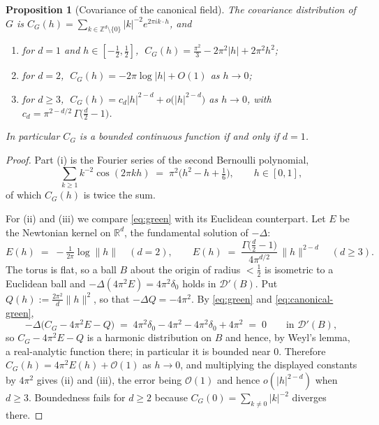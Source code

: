 \documentclass[10pt,a4paper]{amsart}
\newtheorem{proposition}{Proposition}
\newcommand{\RR}{\mathbb{R}}
\newcommand{\ZZ}{\mathbb{Z}}
\newcommand{\calD}{\mathcal{D}}
\newcommand{\calO}{\mathcal{O}}
\begin{document}
\begin{proposition}[Covariance of the canonical field]\label{prop:canonical-cov}
The covariance distribution of $G$ is
$C_G(h) = \sum_{k \in \ZZ^d\setminus\{0\}} |k|^{-2} e^{2\pi i k\cdot h}$, and
\begin{enumerate}
\item[(i)] for $d=1$ and $h \in [-\tfrac12,\tfrac12]$,
    $\;C_G(h) = \tfrac{\pi^2}{3} - 2\pi^2|h| + 2\pi^2 h^2$;
\item[(ii)] for $d=2$, $\;C_G(h) = -2\pi\log|h| + O(1)$ as $h \to 0$;
\item[(iii)] for $d \geq 3$,
    $\;C_G(h) = c_d|h|^{2-d} + o\bigl(|h|^{2-d}\bigr)$ as $h \to 0$, with
    $c_d = \pi^{2-d/2}\,\Gamma\bigl(\tfrac d2 - 1\bigr)$.
\end{enumerate}
In particular $C_G$ is a bounded continuous function if and only if $d = 1$.
\end{proposition}

\begin{proof}
Part (i) is the Fourier series of the second Bernoulli polynomial,
\[
    \sum_{k\geq1} k^{-2}\cos(2\pi k h) \;=\; \pi^2\bigl(h^2-h+\tfrac16\bigr),
    \qquad h \in [0,1],
\]
of which $C_G(h)$ is twice the sum.

For (ii) and (iii) we compare \eqref{eq:green} with its Euclidean counterpart.
Let $E$ be the Newtonian kernel on $\RR^d$, the fundamental solution of
$-\Delta$:
\[
    E(h) \;=\; -\tfrac{1}{2\pi}\log\|h\| \quad (d=2), \qquad
    E(h) \;=\; \frac{\Gamma\bigl(\tfrac d2-1\bigr)}{4\pi^{d/2}}\,\|h\|^{2-d}
    \quad (d\geq3) .
\]
The torus is flat, so a ball $B$ about the origin of radius $<\tfrac12$ is
isometric to a Euclidean ball and $-\Delta(4\pi^2 E) = 4\pi^2\delta_0$ holds in
$\calD'(B)$. Put $Q(h) := \tfrac{2\pi^2}{d}\|h\|^2$, so that
$-\Delta Q = -4\pi^2$. By \eqref{eq:green} and \eqref{eq:canonical-green},
\[
    -\Delta\bigl(C_G - 4\pi^2E - Q\bigr) \;=\; 4\pi^2\delta_0 - 4\pi^2
        - 4\pi^2\delta_0 + 4\pi^2 \;=\; 0 \qquad\text{in } \calD'(B) ,
\]
so $C_G - 4\pi^2E - Q$ is a harmonic distribution on $B$ and hence, by Weyl's
lemma, a real-analytic function there; in particular it is bounded near $0$.
Therefore $C_G(h) = 4\pi^2 E(h) + \calO(1)$ as $h \to 0$, and multiplying the
displayed constants by $4\pi^2$ gives (ii) and (iii), the error being $\calO(1)$
and hence $o(|h|^{2-d})$ when $d\geq3$. Boundedness fails for $d \geq 2$ because
$C_G(0) = \sum_{k \neq 0}|k|^{-2}$ diverges there.
\end{proof}
\end{document}
